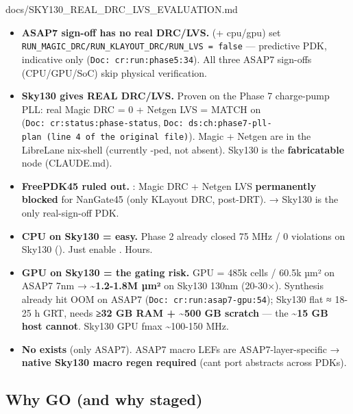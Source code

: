 \begin{relocated}{docs/SKY130_REAL_DRC_LVS_EVALUATION.md}
\begin{itemize}
\tightlist
\item
  \textbf{ASAP7 sign-off has no real DRC/LVS.}
   (+ cpu/gpu) set
  \texttt{RUN\_\allowbreak{}MAGIC\_\allowbreak{}DRC/\allowbreak{}RUN\_\allowbreak{}KLAYOUT\_\allowbreak{}DRC/\allowbreak{}RUN\_\allowbreak{}LVS\ =\allowbreak{}\ false}
  --- predictive PDK, indicative only
  (\texttt{Doc:\allowbreak{}\ cr:\allowbreak{}run:\allowbreak{}phase5:\allowbreak{}34}).
  All three ASAP7 sign-offs (CPU/\allowbreak{}GPU/\allowbreak{}SoC) skip
  physical verification.
\item
  \textbf{Sky130 gives REAL DRC/LVS.} Proven on the Phase 7 charge-pump
  PLL: real Magic DRC = 0 + Netgen LVS = MATCH on 
  (\texttt{Doc:\allowbreak{}\ cr:\allowbreak{}status:\allowbreak{}phase-\allowbreak{}status},
  \texttt{Doc:\allowbreak{}\ ds:\allowbreak{}ch:\allowbreak{}phase7-\allowbreak{}pll-\allowbreak{}plan\ (line\ 4\ of\ the\ original\ file)}).
  Magic + Netgen are in the LibreLane nix-shell (currently
  -ped, not absent). Sky130 is the \textbf{fabricatable}
  node (CLAUDE.md).
\item
  \textbf{FreePDK45 ruled out.} : Magic
  DRC + Netgen LVS \textbf{permanently blocked} for NanGate45 (only
  KLayout DRC, post-DRT). → Sky130 is the only real-sign-off PDK.
\item
  \textbf{CPU on Sky130 = easy.} Phase 2 already closed 75 MHz / 0
  violations on Sky130 (). Just enable
  . Hours.
\item
  \textbf{GPU on Sky130 = the gating risk.} GPU = 485k cells / 60.5k µm²
  on ASAP7 7nm → \textbf{\textasciitilde1.2-1.8M µm²} on Sky130 130nm
  (20-30×). Synthesis already hit OOM on ASAP7
  (\texttt{Doc:\allowbreak{}\ cr:\allowbreak{}run:\allowbreak{}asap7-\allowbreak{}gpu:\allowbreak{}54});
  Sky130 flat ≈ 18-25 h GRT, needs \textbf{≥32 GB RAM +
  \textasciitilde500 GB scratch} --- the \textbf{\textasciitilde15 GB
  host cannot}. Sky130 GPU fmax \textasciitilde100-150 MHz.
\item
  \textbf{No  exists} (only ASAP7). ASAP7 macro
  LEFs are ASAP7-layer-specific → \textbf{native Sky130 macro regen
  required} (can\textquotesingle t port abstracts across PDKs).
\end{itemize}

\subsection{Why GO (and why staged)}\label{tm:pd:sky130-real-drc-lvs:2-why-go-and-why-staged}


\end{relocated}
